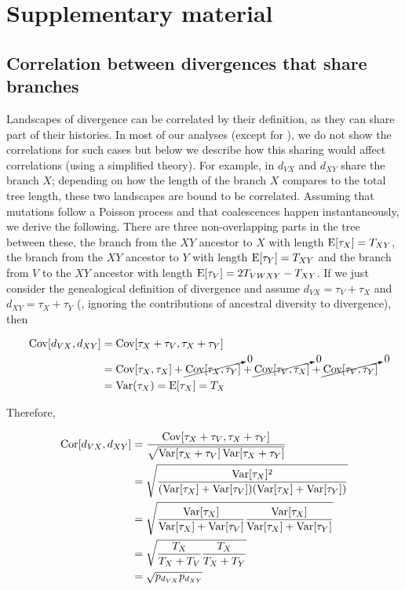 \section*{Supplementary material}

\subsection{Correlation between divergences that share branches}\label{sec:share}

Landscapes of divergence can be correlated by their definition, as they can share part of their histories.
In most of our analyses (except for ), we do not show the correlations for such cases but below we describe how this sharing would affect correlations (using a simplified theory).
For example, in  $d_{VX}$ and $d_{XY}$ share the branch $X$;
depending on how the length of the branch $X$ compares to the total tree length, these two landscapes are bound to be correlated.
Assuming that mutations follow a Poisson process and that coalescences happen instantaneously, we derive the following.
There are three non-overlapping parts in the tree between these, the branch from the $XY$ ancestor to $X$ with length $\operatorname{E} [\tau_X]=T_{XY}$, the branch from the $XY$ ancestor to $Y$ with length $\operatorname{E} [\tau_Y]=T_{XY}$ and the branch from $V$ to the $XY$ ancestor with length $\operatorname{E}[\tau_V]=2T_{VWXY} - T_{XY}$.
If we just consider the genealogical definition of divergence and assume $d_{VX} = \tau_V + \tau_X$ and $d_{XY} = \tau_X + \tau_Y$ (\ie, ignoring the contributions of ancestral diversity to divergence), then

\begin{align*}
\operatorname{Cov} [ d_{VX}, d_{XY} ] &= \operatorname{Cov} [ \tau_X + \tau_V, \tau_X + \tau_Y ] \\
 &= \operatorname{Cov} [ \tau_X, \tau_X ] + \cancelto{0}{\operatorname{Cov} [ \tau_X, \tau_Y ]} + \cancelto{0}{\operatorname{Cov} [ \tau_V, \tau_X ]} + \cancelto{0}{\operatorname{Cov} [ \tau_V, \tau_Y ]} \\
 &= \operatorname{Var}(\tau_X) = \operatorname{E}[\tau_X] = T_X
\end{align*}

Therefore, 

\begin{align*}
\operatorname{Cor} [ d_{VX}, d_{XY} ] &= \frac{\operatorname{Cov} [ \tau_X + \tau_V, \tau_X + \tau_Y ]}{\sqrt{\operatorname{Var}[\tau_X + \tau_V]\operatorname{Var}[\tau_X + \tau_Y]}} \\
 &= \sqrt{\frac{\operatorname{Var}[\tau_X]^2}{(\operatorname{Var}[\tau_X]+\operatorname{Var}[\tau_V])(\operatorname{Var}[\tau_X]+\operatorname{Var}[\tau_Y])}} \\
 &= \sqrt{\frac{\operatorname{Var}[\tau_X]}{\operatorname{Var}[\tau_X]+\operatorname{Var}[\tau_V]}\frac{\operatorname{Var}[\tau_X]}{\operatorname{Var}[\tau_X]+\operatorname{Var}[\tau_Y]}} \\ 
 &= \sqrt{\frac{T_X}{T_X+T_V}\frac{T_X}{T_X +T_Y}} \\
 &= \sqrt{p_{d_{VX}} p_{d_{XY}}}
\end{align*}


